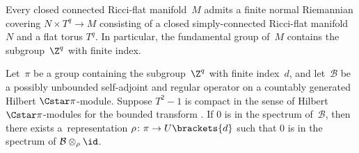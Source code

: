 \documentclass[pdftex]{sigma}
\numberwithin{equation}{section}
\begin{document}
\begin{thm} \label{ThmStructureTheorem}
 Every closed connected Ricci-flat manifold~$M$ admits a finite normal Riemannian covering $N\times T^q \to M$ consisting of a closed simply-connected Ricci-flat manifold~$N$ and a flat torus $T^q$. In particular, the fundamental group of~$M$ contains the subgroup~$\Z^q$ with finite index.
\end{thm}

\begin{prop} \label{PropDetectionPrinciple}
Let~$\pi$ be a group containing the subgroup~$\Z^q$ with finite index~$d$, and let~$\mathcal{B}$ be a possibly unbounded self-adjoint and regular operator on a countably generated Hilbert $\Cstar \pi$-module. Suppose $T^2-1$ is compact in the sense of Hilbert $\Cstar \pi$-modules for the bounded transform . If $0$ is in the spectrum of~$\mathcal{B}$, then there exists a~representation $\rho\colon \pi \to U\brackets{d}$ such that $0$ is in the spectrum of $\mathcal{B}\otimes_{\rho} \id$.
\end{prop}
\end{document}
